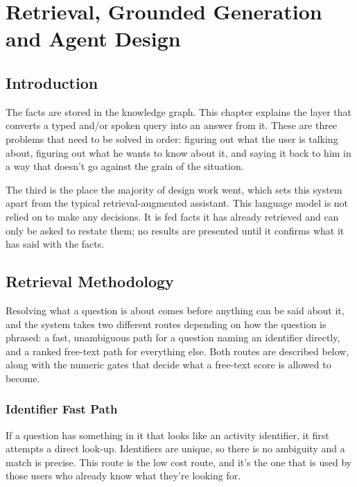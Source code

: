 \chapter{Retrieval, Grounded Generation and Agent Design}
\label{ch:agent}
\minitoc

\section*{Introduction}
The facts are stored in the knowledge graph. This chapter explains the layer that converts a typed and/or spoken query into an answer from it. These are three problems that need to be solved in order: figuring out what the user is talking about, figuring out what he wants to know about it, and saying it back to him in a way that doesn't go against the grain of the situation.

The third is the place the majority of design work went, which sets this system apart from the typical retrieval-augmented assistant\citep{lewis2020rag}. This language model is not relied on to make any decisions. It is fed facts it has already retrieved and can only be asked to restate them; no results are presented until it confirms what it has said with the facts.

\section{Retrieval Methodology}

Resolving what a question is about comes before anything can be said about it, and the
system takes two different routes depending on how the question is phrased: a fast,
unambiguous path for a question naming an identifier directly, and a ranked free-text path
for everything else. Both routes are described below, along with the numeric gates that
decide what a free-text score is allowed to become.

\subsection{Identifier Fast Path}

If a question has something in it that looks like an activity identifier, it first attempts a direct look-up. Identifiers are unique, so there is no ambiguity and a match is precise. This route is the low cost route, and it's the one that is used by those users who already know what they're looking for.


